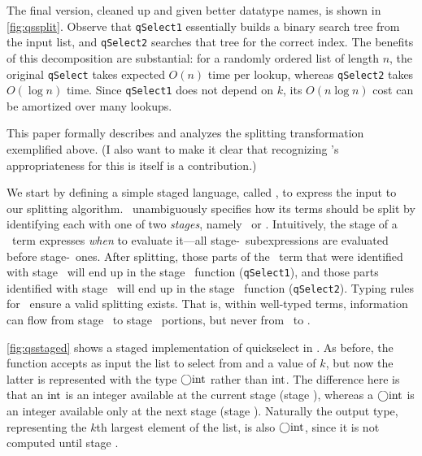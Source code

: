 The final version, cleaned up and given better datatype names, is shown in \ref{fig:qssplit}.
Observe that \texttt{qSelect1} essentially builds a binary search tree from the input list, 
and \texttt{qSelect2} searches that tree for the correct index.
The benefits of this decomposition are substantial: for a randomly ordered list of length $n$, 
the original \texttt{qSelect} takes expected $O(n)$ time per lookup, 
whereas \texttt{qSelect2} takes $O(\log n)$ time.
Since \texttt{qSelect1} does not depend on $k$, its $O(n\log n)$ cost can be amortized over many lookups.


This paper formally describes and analyzes the splitting transformation exemplified above.
(I also want to make it clear that recognizing \lang's appropriateness for this is itself is a contribution.)

We start by defining a simple staged language, called \lang, to express the input to our splitting algorithm.  
\lang\ unambiguously specifies how its terms should be split
by identifying each with one of two {\em stages}, namely \bbone\ or \bbtwo.
Intuitively, the stage of a \lang\ term expresses \emph{when} to evaluate it---all stage-\bbone\
subexpressions are evaluated before stage-\bbtwo\ ones.  
After splitting, those parts of the \lang\ term that were identified with stage \bbone\ 
will end up in the stage \bbone\ function ({\tt qSelect1}), 
and those parts identified with stage \bbtwo\ will end up in the stage \bbtwo\ function ({\tt qSelect2}).
Typing rules for \lang\ ensure a valid splitting exists.  That is, 
within well-typed terms, information can flow from stage \bbone\ to stage \bbtwo\ portions,
but never from \bbtwo\ to \bbone.

\ref{fig:qsstaged} shows a staged implementation of quickselect in \lang.
As before, the function accepts as input the list to select from and a value of $k$,
but now the latter is represented with the type $\bigcirc{\rm int}$ rather than ${\rm int}$.
The difference here is that an ${\rm int}$ is an integer available at the current stage (stage \bbone), 
whereas a $\bigcirc{\rm int}$ is an integer available only at the next stage (stage \bbtwo).
Naturally the output type, representing the $k$th largest element of the list,
is also $\bigcirc{\rm int}$, since it is not computed until stage \bbtwo.


